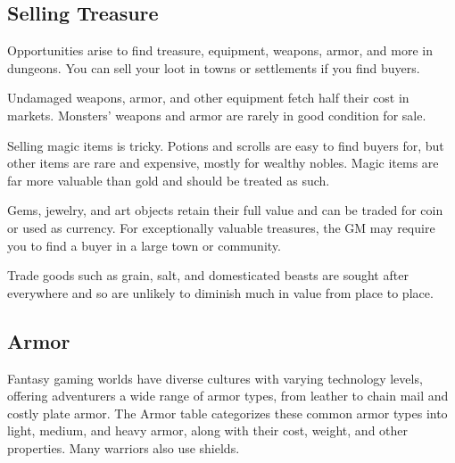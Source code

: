 \subsection{Selling Treasure}\label{_selling_treasure}

Opportunities arise to find treasure, equipment, weapons, armor, and
more in dungeons. You can sell your loot in towns or settlements if you
find buyers.

Undamaged weapons, armor, and other equipment fetch half their cost in
markets. Monsters' weapons and armor are rarely in good condition for
sale.

Selling magic items is tricky. Potions and scrolls are easy to find
buyers for, but other items are rare and expensive, mostly for wealthy
nobles. Magic items are far more valuable than gold and should be
treated as such.

Gems, jewelry, and art objects retain their full value and can be traded
for coin or used as currency. For exceptionally valuable treasures, the
GM may require you to find a buyer in a large town or community.

Trade goods such as grain, salt, and domesticated beasts are sought
after everywhere and so are unlikely to diminish much in value from
place to place.

\subsection{Armor}\label{_armor}

Fantasy gaming worlds have diverse cultures with varying technology
levels, offering adventurers a wide range of armor types, from leather
to chain mail and costly plate armor. The Armor table categorizes these
common armor types into light, medium, and heavy armor, along with their
cost, weight, and other properties. Many warriors also use shields.

